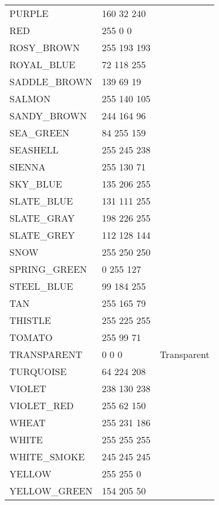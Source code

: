 \documentclass{article}
\begin{document}
\begin{longtable}{lll}
PURPLE & 160 32 240 & \colorbox[RGB]{160 32 240}{\phantom{MMMMMMMM}}\\
RED & 255 0 0 & \colorbox[RGB]{255 0 0}{\phantom{MMMMMMMM}}\\
ROSY\_BROWN & 255 193 193 & \colorbox[RGB]{255 193 193}{\phantom{MMMMMMMM}}\\
ROYAL\_BLUE & 72 118 255 & \colorbox[RGB]{72 118 255}{\phantom{MMMMMMMM}}\\
SADDLE\_BROWN & 139 69 19 & \colorbox[RGB]{139 69 19}{\phantom{MMMMMMMM}}\\
SALMON & 255 140 105 & \colorbox[RGB]{255 140 105}{\phantom{MMMMMMMM}}\\
SANDY\_BROWN & 244 164 96 & \colorbox[RGB]{244 164 96}{\phantom{MMMMMMMM}}\\
SEA\_GREEN & 84 255 159 & \colorbox[RGB]{84 255 159}{\phantom{MMMMMMMM}}\\
SEASHELL & 255 245 238 & \colorbox[RGB]{255 245 238}{\phantom{MMMMMMMM}}\\
SIENNA & 255 130 71 & \colorbox[RGB]{255 130 71}{\phantom{MMMMMMMM}}\\
SKY\_BLUE & 135 206 255 & \colorbox[RGB]{135 206 255}{\phantom{MMMMMMMM}}\\
SLATE\_BLUE & 131 111 255 & \colorbox[RGB]{131 111 255}{\phantom{MMMMMMMM}}\\
SLATE\_GRAY & 198 226 255 & \colorbox[RGB]{198 226 255}{\phantom{MMMMMMMM}}\\
SLATE\_GREY & 112 128 144 & \colorbox[RGB]{112 128 144}{\phantom{MMMMMMMM}}\\
SNOW & 255 250 250 & \colorbox[RGB]{255 250 250}{\phantom{MMMMMMMM}}\\
SPRING\_GREEN & 0 255 127 & \colorbox[RGB]{0 255 127}{\phantom{MMMMMMMM}}\\
STEEL\_BLUE & 99 184 255 & \colorbox[RGB]{99 184 255}{\phantom{MMMMMMMM}}\\
TAN & 255 165 79 & \colorbox[RGB]{255 165 79}{\phantom{MMMMMMMM}}\\
THISTLE & 255 225 255 & \colorbox[RGB]{255 225 255}{\phantom{MMMMMMMM}}\\
TOMATO & 255 99 71 & \colorbox[RGB]{255 99 71}{\phantom{MMMMMMMM}}\\
TRANSPARENT & 0 0 0 & Transparent \\
TURQUOISE & 64 224 208 & \colorbox[RGB]{64 224 208}{\phantom{MMMMMMMM}}\\
VIOLET & 238 130 238 & \colorbox[RGB]{238 130 238}{\phantom{MMMMMMMM}}\\
VIOLET\_RED & 255 62 150 & \colorbox[RGB]{255 62 150}{\phantom{MMMMMMMM}}\\
WHEAT & 255 231 186 & \colorbox[RGB]{255 231 186}{\phantom{MMMMMMMM}}\\
WHITE & 255 255 255 & \colorbox[RGB]{255 255 255}{\phantom{MMMMMMMM}}\\
WHITE\_SMOKE & 245 245 245 & \colorbox[RGB]{245 245 245}{\phantom{MMMMMMMM}}\\
YELLOW & 255 255 0 & \colorbox[RGB]{255 255 0}{\phantom{MMMMMMMM}}\\
YELLOW\_GREEN & 154 205 50 & \colorbox[RGB]{154 205 50}{\phantom{MMMMMMMM}}
\end{longtable}
\end{document}
